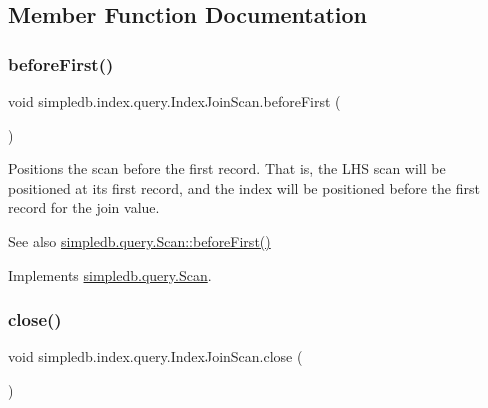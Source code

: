 \subsection{Member Function Documentation}
\mbox{\label{classsimpledb_1_1index_1_1query_1_1IndexJoinScan_abbdd650c312ffc1ba633f57f5988fb85}} 
\subsubsection{\texorpdfstring{before\+First()}{beforeFirst()}}
{\footnotesize\ttfamily void simpledb.\+index.\+query.\+Index\+Join\+Scan.\+before\+First (\begin{DoxyParamCaption}{ }\end{DoxyParamCaption})\hspace{0.3cm}{\ttfamily [inline]}}

Positions the scan before the first record. That is, the L\+HS scan will be positioned at its first record, and the index will be positioned before the first record for the join value. \begin{DoxySeeAlso}{See also}
\hyperlink{interfacesimpledb_1_1query_1_1Scan_a2eceb634b69da9bf1269a4355808cc6b}{simpledb.\+query.\+Scan\+::before\+First()} 
\end{DoxySeeAlso}


Implements \hyperlink{interfacesimpledb_1_1query_1_1Scan_a2eceb634b69da9bf1269a4355808cc6b}{simpledb.\+query.\+Scan}.

\mbox{\label{classsimpledb_1_1index_1_1query_1_1IndexJoinScan_a2746415c838f22a234167417f8c538b6}} 
\subsubsection{\texorpdfstring{close()}{close()}}
{\footnotesize\ttfamily void simpledb.\+index.\+query.\+Index\+Join\+Scan.\+close (\begin{DoxyParamCaption}{ }\end{DoxyParamCaption})\hspace{0.3cm}{\ttfamily [inline]}}

